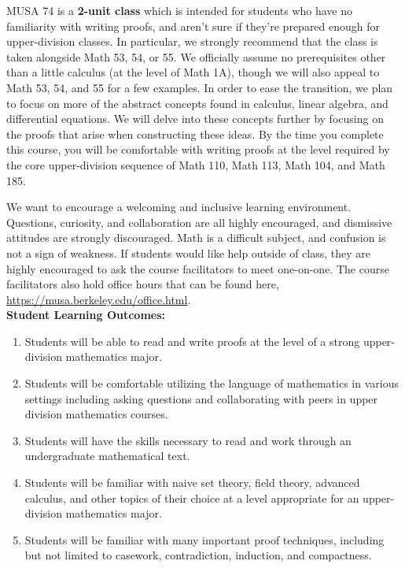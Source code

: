 \documentclass[11pt, a4paper]{article}
\begin{document}
MUSA 74 is a \textbf{2-unit class} which is intended for students who have no familiarity with writing proofs, and aren’t sure if they’re prepared enough for upper-division classes. In particular, we strongly recommend that the class is taken alongside Math 53, 54, or 55. We officially assume no prerequisites other than a little calculus (at the level of Math 1A), though we will also appeal to Math 53, 54, and 55 for a few examples. In order to ease the transition, we plan to focus on more of the abstract concepts found in calculus, linear algebra, and differential equations. We will delve into these concepts further by focusing on the proofs that arise when constructing these ideas. By the time you complete this course, you will be comfortable with writing proofs at the level required by the core upper-division sequence of Math 110, Math 113, Math 104, and Math 185.

We want to encourage a welcoming and inclusive learning environment. Questions, curiosity, and collaboration are all highly encouraged, and dismissive attitudes are strongly discouraged. Math is a difficult subject, and confusion is not a sign of weakness. If students would like help outside of class, they are highly encouraged to ask the course facilitators to meet one-on-one. The course facilitators also hold office hours that can be found here, \url{https://musa.berkeley.edu/office.html}.
\\

\noindent \textbf{Student Learning Outcomes:} 

\begin{enumerate}
    \item Students will be able to read and write proofs at the level of a strong upper-division mathematics major.
    \item Students will be comfortable utilizing the language of mathematics in various settings including asking questions and collaborating with peers in upper division mathematics courses.
    \item Students will have the skills necessary to read and work through an undergraduate mathematical text.
    \item Students will be familiar with naive set theory, field theory, advanced calculus, and other topics of their choice at a level appropriate for an upper-division mathematics major.
    \item Students will be familiar with many important proof techniques, including but not limited to casework, contradiction, induction, and compactness.
\end{enumerate}
\end{document}
